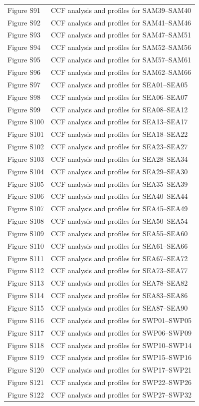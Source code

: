 \documentclass[final]{agujournal2019}
\begin{document}
{\begin{longtable}[]{@{}ll@{}}
Figure S91 & CCF analysis and profiles for SAM39--SAM40 \\
Figure S92 & CCF analysis and profiles for SAM41--SAM46 \\
Figure S93 & CCF analysis and profiles for SAM47--SAM51 \\
Figure S94 & CCF analysis and profiles for SAM52--SAM56 \\
Figure S95 & CCF analysis and profiles for SAM57--SAM61 \\
Figure S96 & CCF analysis and profiles for SAM62--SAM66 \\
Figure S97 & CCF analysis and profiles for SEA01--SEA05 \\
Figure S98 & CCF analysis and profiles for SEA06--SEA07 \\
Figure S99 & CCF analysis and profiles for SEA08--SEA12 \\
Figure S100 & CCF analysis and profiles for SEA13--SEA17 \\
Figure S101 & CCF analysis and profiles for SEA18--SEA22 \\
Figure S102 & CCF analysis and profiles for SEA23--SEA27 \\
Figure S103 & CCF analysis and profiles for SEA28--SEA34 \\
Figure S104 & CCF analysis and profiles for SEA29--SEA30 \\
Figure S105 & CCF analysis and profiles for SEA35--SEA39 \\
Figure S106 & CCF analysis and profiles for SEA40--SEA44 \\
Figure S107 & CCF analysis and profiles for SEA45--SEA49 \\
Figure S108 & CCF analysis and profiles for SEA50--SEA54 \\
Figure S109 & CCF analysis and profiles for SEA55--SEA60 \\
Figure S110 & CCF analysis and profiles for SEA61--SEA66 \\
Figure S111 & CCF analysis and profiles for SEA67--SEA72 \\
Figure S112 & CCF analysis and profiles for SEA73--SEA77 \\
Figure S113 & CCF analysis and profiles for SEA78--SEA82 \\
Figure S114 & CCF analysis and profiles for SEA83--SEA86 \\
Figure S115 & CCF analysis and profiles for SEA87--SEA90 \\
Figure S116 & CCF analysis and profiles for SWP01--SWP05 \\
Figure S117 & CCF analysis and profiles for SWP06--SWP09 \\
Figure S118 & CCF analysis and profiles for SWP10--SWP14 \\
Figure S119 & CCF analysis and profiles for SWP15--SWP16 \\
Figure S120 & CCF analysis and profiles for SWP17--SWP21 \\
Figure S121 & CCF analysis and profiles for SWP22--SWP26 \\
Figure S122 & CCF analysis and profiles for SWP27--SWP32 \\
\end{longtable}
}
\end{document}
